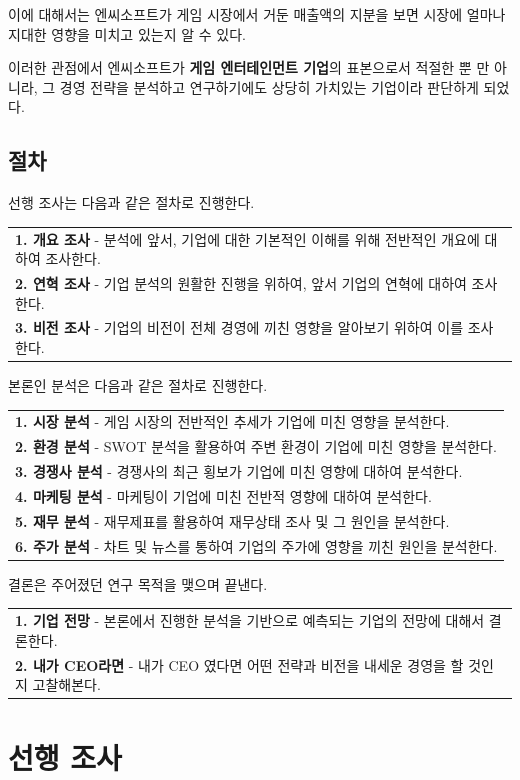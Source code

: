 \documentclass[11pt]{oblivoir}
\newenvironment{textbox}
	{
	\begin{center}
		\begin{tabular}{|p{0.95\textwidth}|}
			\hline
	}
	{
		\\ \hline
		\end{tabular}
		\end{center}
	}
\begin{document}
			이에 대해서는 엔씨소프트가 게임 시장에서 거둔 매출액의 지분을 보면 시장에 얼마나 지대한 영향을 미치고 있는지 알 수 있다.
			
			이러한 관점에서 엔씨소프트가 \textbf{게임 엔터테인먼트 기업}의 표본으로서 적절한 뿐 만 아니라, 그 경영 전략을 분석하고 연구하기에도 상당히 가치있는 기업이라 판단하게 되었다. 
			
		\subsection{절차}
			선행 조사는 다음과 같은 절차로 진행한다.
			\begin{textbox}
				\textbf{1. 개요 조사} - 분석에 앞서, 기업에 대한 기본적인 이해를 위해 전반적인 개요에 대하여 조사한다.
				\\
				\textbf{2. 연혁 조사} - 기업 분석의 원활한 진행을 위하여, 앞서 기업의 연혁에 대하여 조사한다.
				\\
				\textbf{3. 비전 조사} - 기업의 비전이 전체 경영에 끼친 영향을 알아보기 위하여 이를 조사한다.
			\end{textbox}
			본론인 분석은 다음과 같은 절차로 진행한다.
			\begin{textbox}
				\textbf{1. 시장 분석} - 게임 시장의 전반적인 추세가 기업에 미친 영향을 분석한다.
				\\
				\textbf{2. 환경 분석} - SWOT 분석을 활용하여 주변 환경이 기업에 미친 영향을 분석한다.
				\\ 
				\textbf{3. 경쟁사 분석} - 경쟁사의 최근 횡보가 기업에 미친 영향에 대하여 분석한다.
				\\
				\textbf{4. 마케팅 분석} - 마케팅이 기업에 미친 전반적 영향에 대하여 분석한다.
				\\
				\textbf{5. 재무 분석} - 재무제표를 활용하여 재무상태 조사 및 그 원인을 분석한다.
				\\
				\textbf{6. 주가 분석} - 차트 및 뉴스를 통하여 기업의 주가에 영향을 끼친 원인을 분석한다.
			\end{textbox}
			결론은 주어졌던 연구 목적을 맺으며 끝낸다.
			\begin{textbox}
				\textbf{1. 기업 전망} - 본론에서 진행한 분석을 기반으로 예측되는 기업의 전망에 대해서 결론한다.
				\\
				\textbf{2. 내가 CEO라면} - 내가 CEO 였다면 어떤 전략과 비전을 내세운 경영을 할 것인지 고찰해본다. 
			\end{textbox}
	
	\section{선행 조사}
\end{document}
